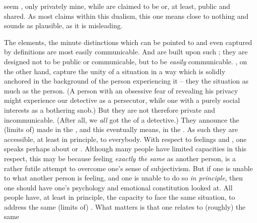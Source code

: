 \pa\label{pa:moodCommunicate}
 seem , only privately mine, while  are
claimed to be  or, at least, public and shared. As most claims
within this dualism, this one means close to nothing and sounds as plausible, as
it is misleading.

The  elements, the minute distinctions which can be
pointed to and even captured by  definitions are most easily
communicable. And  are built upon such ; they are
designed not to be public or communicable, but to be {\em easily} communicable.
 , on the other hand, capture the unity of a
situation in a way which is solidly anchored in the background of the person
experiencing it -- they  the situation as much as the person.  (A
person with an obsessive fear of revealing his privacy might experience our
detective as a persecutor, while one with a purely social interests as a
bothering snob.)  But they are not therefore private and incommunicable.  (After
all, we {\em all} got the  of a detective.)  They announce the
(limits of)  made in the , and this eventually
means, in the .  As such they are accessible, at least in principle, to
everybody.
With respect to feelings and , one speaks perhaps about 
or . Although many people have limited capacities in this respect,
this may be because feeling {\em exactly the same} as another person, is a
rather futile attempt to overcome one's sense of  subjectivism.
But if one is unable to  what another person is feeling, and one
is unable to do so {\em in principle}, then one should have one's psychology and
emotional constitution looked at.  All people have, at least in principle, the
capacity to face the same situation, to address the same (limits of)
. What matters is that one relates to (roughly) the same
